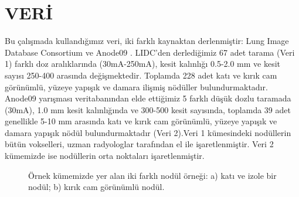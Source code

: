 \documentclass[conference]{IEEEtran}
\begin{document}
\section{VERİ}\label{veriler}
Bu çalışmada kullandığımız veri, iki farklı kaynaktan derlenmiştir: Lung Image Database Consortium \cite{lidc2011} ve Anode09 \cite{anode09}. LIDC'den derlediğimiz 67 adet tarama (Veri 1) farklı doz aralıklarında (30mA-250mA), kesit kalınlığı 0.5-2.0 mm ve kesit sayısı 250-400 arasında değişmektedir. Toplamda 228 adet katı ve kırık cam görünümlü, yüzeye yapışık ve damara ilişmiş nödüller bulundurmaktadır. Anode09 yarışması veritabanından elde ettiğimiz 5 farklı düşük dozlu taramada (30mA), 1.0 mm kesit kalınlığında ve 300-500 kesit sayısında, toplamda 39 adet genellikle 5-10 mm arasında katı ve kırık cam görünümlü, yüzeye yapışık ve damara yapışık nödül bulundurmaktadır (Veri 2).Veri 1 kümesindeki nodüllerin bütün vokselleri, uzman radyologlar tarafından el ile işaretlenmiştir. Veri 2 kümemizde ise nodüllerin orta noktaları işaretlenmiştir.

\begin{figure}[tb]
\centering
{}
\caption{Örnek kümemizde yer alan iki farklı nodül örneği: a) katı ve izole bir nodül; b) kırık cam görünümlü nodül.}
\label{fig0}
\end{figure}
\end{document}
